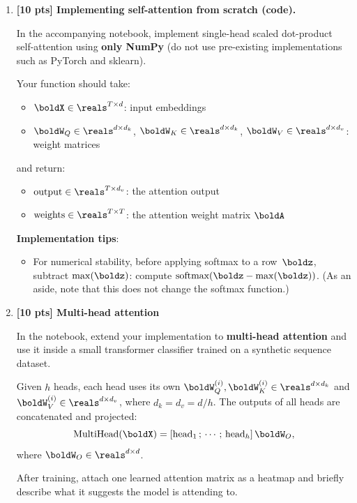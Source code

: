 \documentclass[submit]{harvardml}
\begin{document}
\begin{problem}
\begin{enumerate}
\begin{enumerate}
  \item The standard fix is to add a \textbf{positional encoding}
  $\boldP\boldE \in \reals^{T \times d}$ to the input:
  $\boldX' = \boldX + \boldP\boldE$.
  Why does this break permutation equivariance?
\end{enumerate}

\item \textbf{[10 pts] Implementing self-attention from scratch (code).}

In the accompanying notebook, implement single-head scaled dot-product self-attention
using \textbf{only NumPy} (do not use pre-existing implementations such as PyTorch and sklearn).

Your function should take:
\begin{itemize}
  \item $\boldX \in \reals^{T \times d}$: input embeddings
  \item $\boldW_Q \in \reals^{d \times d_k}$, $\boldW_K \in \reals^{d \times d_k}$,
        $\boldW_V \in \reals^{d \times d_v}$: weight matrices
\end{itemize}
and return:
\begin{itemize}
  \item $\text{output} \in \reals^{T \times d_v}$: the attention output
  \item $\text{weights} \in \reals^{T \times T}$: the attention weight matrix $\boldA$
\end{itemize}

\textbf{Implementation tips}:
\begin{itemize}
  \item For numerical stability, before applying softmax to a row~$\boldz$, subtract
  $\max(\boldz)$: compute $\text{softmax}(\boldz - \max(\boldz))$. (As an aside, note that this does not change the softmax function.)
\end{itemize}

\item \textbf{[10 pts] Multi-head attention}

In the notebook, extend your implementation to \textbf{multi-head attention}
and use it inside a small transformer classifier trained on a synthetic
sequence dataset.

Given $h$ heads, each head
  uses its own $\boldW_Q^{(i)}, \boldW_K^{(i)} \in \reals^{d \times d_k}$ and
  $\boldW_V^{(i)} \in \reals^{d \times d_v}$, where $d_k = d_v = d / h$.
  The outputs of all heads are concatenated and projected:
  \[
    \text{MultiHead}(\boldX) = [\text{head}_1 \,;\, \cdots \,;\, \text{head}_h]\,
    \boldW_O,
  \]
  where $\boldW_O \in \reals^{d \times d}$.

After training, attach one learned attention matrix as a heatmap and
briefly describe what it suggests the model is attending to.


\end{enumerate}

\end{problem}
\end{document}
